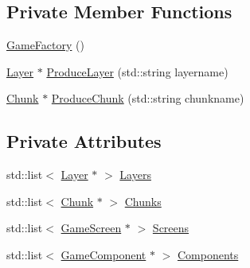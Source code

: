 \subsection*{Private Member Functions}
\begin{DoxyCompactItemize}
\item 
\hyperlink{class_game_factory_a37c039131801be05d138bd76bb125ab3}{Game\-Factory} ()
\item 
\hyperlink{class_layer}{Layer} $\ast$ \hyperlink{class_game_factory_a8fb704f6440c30dd368b409adc9fffad}{Produce\-Layer} (std\-::string layername)
\item 
\hyperlink{class_chunk}{Chunk} $\ast$ \hyperlink{class_game_factory_a6d10cc5db3ba26bb6041a9449dfab92a}{Produce\-Chunk} (std\-::string chunkname)
\end{DoxyCompactItemize}
\subsection*{Private Attributes}
\begin{DoxyCompactItemize}
\item 
std\-::list$<$ \hyperlink{class_layer}{Layer} $\ast$ $>$ \hyperlink{class_game_factory_a7ab6a968cb7af49813407fe66927c126}{Layers}
\item 
std\-::list$<$ \hyperlink{class_chunk}{Chunk} $\ast$ $>$ \hyperlink{class_game_factory_a77496a7ea1e2fa54acb18c499b3bd3bb}{Chunks}
\item 
std\-::list$<$ \hyperlink{class_game_screen}{Game\-Screen} $\ast$ $>$ \hyperlink{class_game_factory_a16a8135f6d6b1b60c0d08b39340b34cc}{Screens}
\item 
std\-::list$<$ \hyperlink{class_game_component}{Game\-Component} $\ast$ $>$ \hyperlink{class_game_factory_a90fc6360610babaf3d2d880f782772b3}{Components}
\end{DoxyCompactItemize}


